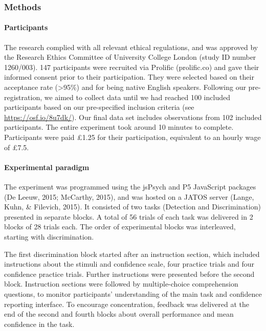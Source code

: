 \documentclass[
  english,
  man]{apa6}
\let\oldparagraph\paragraph
\renewcommand{\paragraph}[1]{\oldparagraph{#1}\mbox{}}
\begin{document}
\hypertarget{methods-1}{%
\subsubsection{Methods}\label{methods-1}}

\hypertarget{participants-1}{%
\paragraph{Participants}\label{participants-1}}

The research complied with all relevant ethical regulations, and was approved by the Research Ethics Committee of University College London (study ID number 1260/003). 147 participants were recruited via Prolific (prolific.co) and gave their informed consent prior to their participation. They were selected based on their acceptance rate (\textgreater95\%) and for being native English speakers. Following our pre-registration, we aimed to collect data until we had reached 100 included participants based on our pre-specified inclusion criteria (see \url{https://osf.io/8u7dk/}). Our final data set includes observations from 102 included participants. The entire experiment took around 10 minutes to complete. Participants were paid £1.25 for their participation, equivalent to an hourly wage of £7.5.

\hypertarget{experimental-paradigm}{%
\paragraph{Experimental paradigm}\label{experimental-paradigm}}

The experiment was programmed using the jsPsych and P5 JavaScript packages (De Leeuw, 2015; McCarthy, 2015), and was hosted on a JATOS server (Lange, Kuhn, \& Filevich, 2015). It consisted of two tasks (Detection and Discrimination) presented in separate blocks. A total of 56 trials of each task was delivered in 2 blocks of 28 trials each. The order of experimental blocks was interleaved, starting with discrimination.

The first discrimination block started after an instruction section, which included instructions about the stimuli and confidence scale, four practice trials and four confidence practice trials. Further instructions were presented before the second block. Instruction sections were followed by multiple-choice comprehension questions, to monitor participants' understanding of the main task and confidence reporting interface. To encourage concentration, feedback was delivered at the end of the second and fourth blocks about overall performance and mean confidence in the task.
\end{document}
